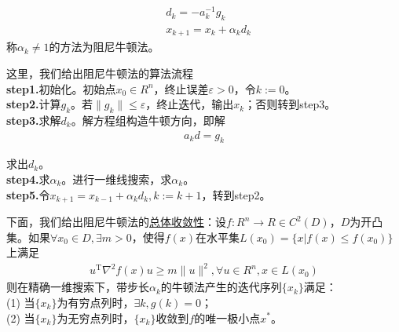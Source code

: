         \begin{align*}
         & d_k  =-a^{-1}_k g_k\\
         & x_{k+1} =x_k+{\alpha}_k d_k
        \end{align*}
        称${\alpha}_k \ne 1$的方法为阻尼牛顿法。
        \par
        这里，我们给出阻尼牛顿法的算法流程\\
        \textbf{step1.}初始化。初始点$x_0 \in R^n$，终止误差$\varepsilon >0$，令$k:=0$。\\
        \textbf{step2.}计算$g_k$。若$\|g_k\| \leqslant \varepsilon $，终止迭代，输出$x_k$；否则转到step3。\\
        \textbf{step3.}求解$d_k$。解方程组构造牛顿方向，即解
        \begin{align*}
         a_k d = g_k
        \end{align*}
        \par
        求出$d_k$。\\
        \textbf{step4.}求${\alpha}_k$。进行一维线搜索，求${\alpha}_k$。\\
        \textbf{step5.}令$x_{k+1}=x_{k-1}+{\alpha}_k d_k,k:=k+1$，转到step2。
        \par
        下面，我们给出阻尼牛顿法的\underline{总体收敛性}：设$f:R^n \to R \in C^2(D)$，$D$为开凸集。如果$\forall x_0 \in D,\exists m >0$，使得$f(x)$在水平集$L(x_0)=\{x|f(x) \leqslant f(x_0)\}$上满足
        \begin{align*}
         u^\mathrm{T} \nabla^2 f(x)u \geqslant m \|u\|^2, \forall u \in R^n,x \in L(x_0)
        \end{align*}
        则在精确一维搜索下，带步长${\alpha}_k$的牛顿法产生的迭代序列$\{x_k\}$满足：\\
        (1) 当$\{x_k\}$为有穷点列时，$\exists k ,g(k)=0$；\\
        (2) 当$\{x_k\}$为无穷点列时，$\{x_k\}$收敛到$f$的唯一极小点$x^*$。
